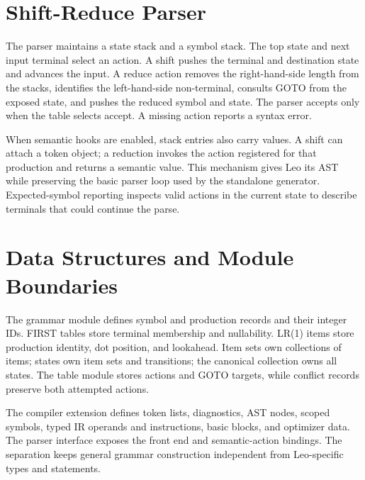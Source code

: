 \documentclass[12pt,a4paper,oneside]{report}
\begin{document}
\section{Shift-Reduce Parser}
The parser maintains a state stack and a symbol stack. The top state and next input terminal select an action. A shift pushes the terminal and destination state and advances the input. A reduce action removes the right-hand-side length from the stacks, identifies the left-hand-side non-terminal, consults GOTO from the exposed state, and pushes the reduced symbol and state. The parser accepts only when the table selects accept. A missing action reports a syntax error.

When semantic hooks are enabled, stack entries also carry values. A shift can attach a token object; a reduction invokes the action registered for that production and returns a semantic value. This mechanism gives Leo its AST while preserving the basic parser loop used by the standalone generator. Expected-symbol reporting inspects valid actions in the current state to describe terminals that could continue the parse.

\section{Data Structures and Module Boundaries}
The grammar module defines symbol and production records and their integer IDs. FIRST tables store terminal membership and nullability. LR(1) items store production identity, dot position, and lookahead. Item sets own collections of items; states own item sets and transitions; the canonical collection owns all states. The table module stores actions and GOTO targets, while conflict records preserve both attempted actions.

The compiler extension defines token lists, diagnostics, AST nodes, scoped symbols, typed IR operands and instructions, basic blocks, and optimizer data. The parser interface exposes the front end and semantic-action bindings. The separation keeps general grammar construction independent from Leo-specific types and statements.
\end{document}
